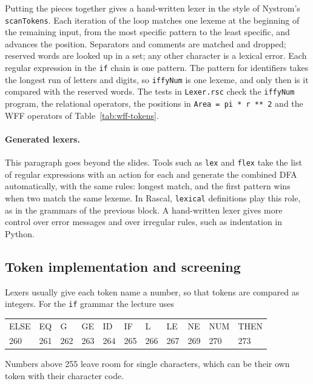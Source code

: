 Putting the pieces together gives a hand-written lexer in the style of
Nystrom's \texttt{scanTokens}. Each iteration of the loop matches one lexeme at
the beginning of the remaining input, from the most specific pattern to the
least specific, and advances the position. Separators and comments are
matched and dropped; reserved words are looked up in a set; any other
character is a lexical error.
Each regular expression in the \texttt{if} chain is one pattern. The pattern for
identifiers takes the longest run of letters and digits, so \texttt{iffyNum} is
one lexeme, and only then is it compared with the reserved words. The tests in
\texttt{Lexer.rsc} check the \texttt{iffyNum} program, the relational operators,
the positions in \texttt{Area = pi * r ** 2} and the WFF operators of
Table~\ref{tab:wff-tokens}.

\paragraph{Generated lexers.} This paragraph goes beyond the slides. Tools such
as \texttt{lex} and \texttt{flex} take the list of regular expressions with an
action for each and generate the combined DFA automatically, with the same
rules: longest match, and the first pattern wins when two match the same
lexeme. In Rascal, \texttt{lexical} definitions play this role, as in the
grammars of the previous block. A hand-written lexer gives more control over
error messages and over irregular rules, such as indentation in Python.

\subsection{Token implementation and screening}

Lexers usually give each token name a number, so that tokens are compared as
integers. For the \texttt{if} grammar the lecture uses
\begin{center}
\small
\begin{tabular}{l l l l l l l l l l l}
  \toprule
  ELSE & EQ & G & GE & ID & IF & L & LE & NE & NUM & THEN \\
  260 & 261 & 262 & 263 & 264 & 265 & 266 & 267 & 269 & 270 & 273 \\
  \bottomrule
\end{tabular}
\end{center}
Numbers above 255 leave room for single characters, which can be their own
token with their character code.


